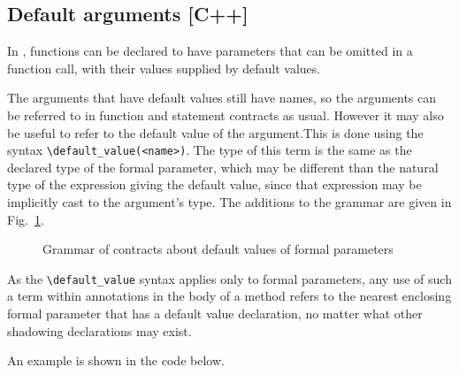 \subsection{Default arguments [C++]}
\label{sec:defargs}
\experimental

In \lang, functions can be declared to have parameters that can be omitted in a function call, with their values supplied by default values. 

The arguments that have default values still have names, so the arguments can be referred to in function and statement contracts as usual. However it may also be useful to refer to the default value of the argument.This is done using the syntax \lstinline|\default_value(<name>)|. The type of this term is the same as the declared type of the formal parameter, which may be different than the natural type of the expression giving the default value, since that expression may be implicitly cast to the argument's type. 
The additions to the grammar are given in Fig.~\ref{fig:gram:default-values}.

\begin{figure}[t]
	\begin{cadre}
		
	\end{cadre}
	\caption{Grammar of contracts about default values of formal parameters}
	\label{fig:gram:default-values}
\end{figure}

As the \lstinline|\default_value| syntax applies only to formal parameters, any use of such a term within annotations in the body of a method refers to the nearest enclosing 
formal parameter that has a default value declaration, no
matter what other shadowing declarations may exist.

An example is shown in the code below.

